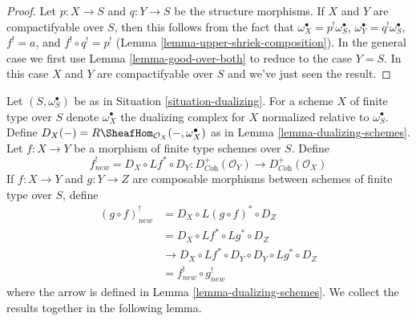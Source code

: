 \begin{proof}
Let $p : X \to S$ and $q : Y \to S$ be the structure morphisms.
If $X$ and $Y$ are compactifyable over $S$, then this follows
from the fact that $\omega_X^\bullet = p^!\omega_S^\bullet$,
$\omega_Y^\bullet = q^!\omega_S^\bullet$, $f^! = a$, and
$f^! \circ q^! = p^!$ (Lemma \ref{lemma-upper-shriek-composition}).
In the general case we first use Lemma \ref{lemma-good-over-both}
to reduce to the case $Y = S$. In this case $X$ and $Y$
are compactifyable over $S$ and we've just seen the result.
\end{proof}

\noindent
Let $(S, \omega_S^\bullet)$ be as in Situation \ref{situation-dualizing}.
For a scheme $X$ of finite type over $S$ denote $\omega_X^\bullet$ the
dualizing complex for $X$ normalized relative to $\omega_S^\bullet$.
Define $D_X(-) = R\SheafHom_{\mathcal{O}_X}(-, \omega_X^\bullet)$
as in Lemma \ref{lemma-dualizing-schemes}.
Let $f : X \to Y$ be a morphism of finite type schemes over $S$.
Define
$$
f_{new}^! = D_X \circ Lf^* \circ D_Y :
D_{\textit{Coh}}^+(\mathcal{O}_Y)
\to
D_{\textit{Coh}}^+(\mathcal{O}_X)
$$
If $f : X \to Y$ and $g : Y \to Z$ are composable
morphisms between schemes of finite type over $S$, define
\begin{align*}
(g \circ f)^!_{new} & = D_X \circ L(g \circ f)^* \circ D_Z \\
& = D_X \circ Lf^* \circ Lg^* \circ D_Z \\
& \to D_X \circ Lf^* \circ D_Y \circ D_Y \circ Lg^* \circ D_Z \\
& = f^!_{new} \circ g^!_{new}
\end{align*}
where the arrow is defined in Lemma \ref{lemma-dualizing-schemes}.
We collect the results together in the following lemma.

